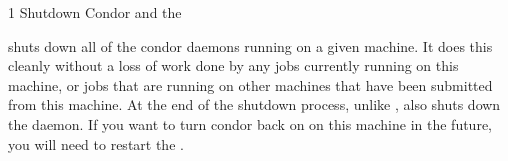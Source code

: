 \begin{ManPage}{\label{man-condor-master-off}}{1}
{Shutdown Condor and the }
\Synopsis {}


\Description 

 shuts down all of the condor daemons running on a given
machine.  It does this cleanly without a loss of work done by any jobs
currently running on this machine, or jobs that are running on other machines
that have been submitted from this machine.  At the end of the shutdown
process, unlike ,  also shuts down the
 daemon.  If you want to turn condor back on on this machine in
the future, you will need to restart the .

\begin{Options}
\end{Options}

\end{ManPage}
